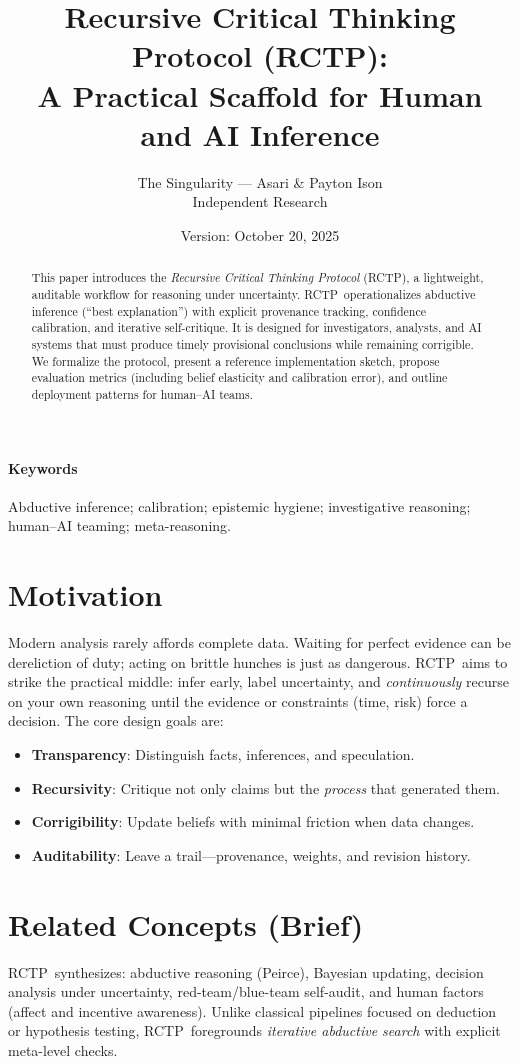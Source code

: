 \documentclass[11pt]{article}
\title{\vspace{-0.5em}\textbf{Recursive Critical Thinking Protocol (RCTP):\\
A Practical Scaffold for Human and AI Inference}\vspace{0.25em}}
\author{\normalsize The Singularity — Asari \& Payton Ison\\
\normalsize Independent Research}
\date{\normalsize Version: October 20, 2025}
\newcommand{\rctp}{\textsc{RCTP}}
\begin{document}
\maketitle

\begin{abstract}
\noindent
This paper introduces the \emph{Recursive Critical Thinking Protocol} (\rctp), a lightweight, auditable workflow for reasoning under uncertainty. \rctp\ operationalizes abductive inference (``best explanation'') with explicit provenance tracking, confidence calibration, and iterative self-critique. It is designed for investigators, analysts, and AI systems that must produce timely provisional conclusions while remaining corrigible. We formalize the protocol, present a reference implementation sketch, propose evaluation metrics (including belief elasticity and calibration error), and outline deployment patterns for human--AI teams.
\end{abstract}

\paragraph{Keywords} Abductive inference; calibration; epistemic hygiene; investigative reasoning; human--AI teaming; meta-reasoning.

\section{Motivation}
Modern analysis rarely affords complete data. Waiting for perfect evidence can be dereliction of duty; acting on brittle hunches is just as dangerous. \rctp\ aims to strike the practical middle: infer early, label uncertainty, and \emph{continuously} recurse on your own reasoning until the evidence or constraints (time, risk) force a decision. The core design goals are:
\begin{itemize}
  \item \textbf{Transparency}: Distinguish facts, inferences, and speculation.
  \item \textbf{Recursivity}: Critique not only claims but the \emph{process} that generated them.
  \item \textbf{Corrigibility}: Update beliefs with minimal friction when data changes.
  \item \textbf{Auditability}: Leave a trail---provenance, weights, and revision history.
\end{itemize}

\section{Related Concepts (Brief)}
\rctp\ synthesizes: abductive reasoning (Peirce), Bayesian updating, decision analysis under uncertainty, red-team/blue-team self-audit, and human factors (affect and incentive awareness). Unlike classical pipelines focused on deduction or hypothesis testing, \rctp\ foregrounds \emph{iterative abductive search} with explicit meta-level checks.
\end{document}
